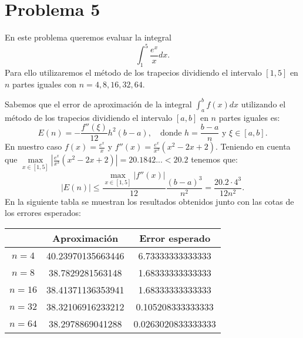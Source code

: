 \documentclass[a4paper]{article}
\begin{document}
\section*{Problema 5}
En este problema queremos evaluar la integral 
\begin{equation}
    \int_1^5\frac{e^x}{x}dx.
\end{equation}
Para ello utilizaremos el método de los trapecios dividiendo el intervalo $[1,5]$ en $n$ partes iguales con $n = 4, 8, 16, 32, 64$.\par Sabemos que el error de aproximación de la integral $\int_a^bf(x)dx$ utilizando el método de los trapecios dividiendo el intervalo $[a,b]$ en $n$ partes iguales es: $$E(n)=-\frac{f''(\xi)}{12}h^2(b-a),\quad\text{donde }h=\frac{b-a}{n}\text{ y }\xi\in[a,b].$$ En nuestro caso $f(x)=\frac{e^x}{x}$ y $f''(x)=\frac{e^x}{x^3}(x^2-2x+2)$. Teniendo en cuenta que $\max\limits_{x\in[1,5]}\left|\frac{e^x}{x^3}(x^2-2x+2)\right|=20.1842...<20.2$ tenemos que: $$|E(n)|\leq\frac{\max_{x\in[1,5]}\left|f''(x)\right|}{12}\frac{(b-a)^3}{n^2}=\frac{20.2\cdot 4^3}{12n^2}.$$ En la siguiente tabla se muestran los resultados obtenidos junto con las cotas de los errores esperados:
\begin{table}[ht]
    \centering
    \begin{tabular}{|c|c|c|}
        \hline
        & Aproximación & Error esperado \\
        \hline 
        $n=4$ & 40.23970135663446 & 6.73333333333333 \\
        \hline
        $n=8$ & 38.7829281563148 & 1.68333333333333 \\
        \hline
        $n=16$ & 38.41371136353941 & 1.68333333333333 \\
        \hline
        $n=32$ & 38.32106916233212 & 0.105208333333333 \\
        \hline
        $n=64$ & 38.2978869041288 & 0.0263020833333333 \\
        \hline
    \end{tabular}
\end{table}\par
\end{document}
